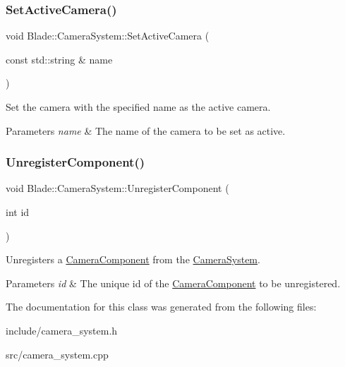 \subsubsection{\texorpdfstring{Set\+Active\+Camera()}{SetActiveCamera()}}
{\footnotesize\ttfamily void Blade\+::\+Camera\+System\+::\+Set\+Active\+Camera (\begin{DoxyParamCaption}\item[{const std\+::string \&}]{name }\end{DoxyParamCaption})\hspace{0.3cm}{\ttfamily [noexcept]}}



Set the camera with the specified name as the active camera. 


\begin{DoxyParams}{Parameters}
{\em name} & The name of the camera to be set as active. \\
\hline
\end{DoxyParams}
\mbox{\label{class_blade_1_1_camera_system_a295fdc352ab2c419940f43610cd06be7}} 
\subsubsection{\texorpdfstring{Unregister\+Component()}{UnregisterComponent()}}
{\footnotesize\ttfamily void Blade\+::\+Camera\+System\+::\+Unregister\+Component (\begin{DoxyParamCaption}\item[{int}]{id }\end{DoxyParamCaption})\hspace{0.3cm}{\ttfamily [noexcept]}}



Unregisters a \hyperlink{class_blade_1_1_camera_component}{Camera\+Component} from the \hyperlink{class_blade_1_1_camera_system}{Camera\+System}. 


\begin{DoxyParams}{Parameters}
{\em id} & The unique id of the \hyperlink{class_blade_1_1_camera_component}{Camera\+Component} to be unregistered. \\
\hline
\end{DoxyParams}


The documentation for this class was generated from the following files\+:\begin{DoxyCompactItemize}
\item 
include/camera\+\_\+system.\+h\item 
src/camera\+\_\+system.\+cpp\end{DoxyCompactItemize}
